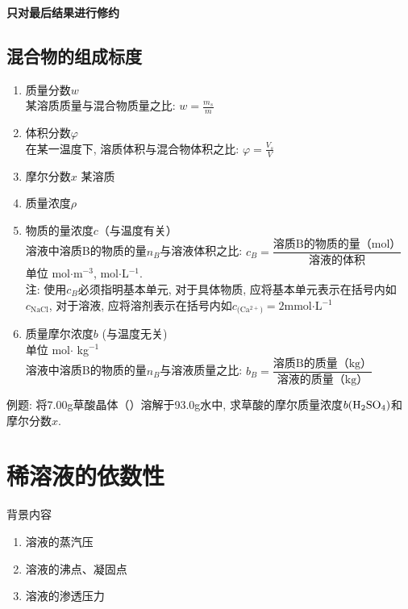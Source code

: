\documentclass[12pt, a4paper, oneside]{ctexbook}
\begin{document}
\textbf{只对最后结果进行修约}



\section*{混合物的组成标度}
\begin{enumerate}
    \item 质量分数$w$ \\某溶质质量与混合物质量之比: $w = \frac{m_s}{m}$
    \item 体积分数$\varphi$\\在某一温度下, 溶质体积与混合物体积之比: $\varphi = \frac{V_s}{V}$
    \item 摩尔分数$x$ 某溶质
    \item 质量浓度$\rho $
    \item 物质的量浓度$c$（与温度有关）\\溶液中溶质B的物质的量$n_B$与溶液体积之比: $c_B = \dfrac{\text{溶质B的物质的量（mol）}}{\text{溶液的体积}}$\\
            单位 mol$\cdot$m$^{-3}$, mol$\cdot$L$^{-1}$.\\
            注: 使用$c_B$必须指明基本单元, 对于具体物质, 应将基本单元表示在括号内如$c_{\text{NaCl}}$, 对于溶液, 应将溶剂表示在括号内如$c_{\text{(Ca$^{2+}$)}} = 2$mmol$\cdot$L$^{-1}$
    \item 质量摩尔浓度$b$ (与温度无关)\\单位 mol$\cdot$ kg$^{-1}$\\
            溶液中溶质B的物质的量$n_B$与溶液质量之比: $b_B = \dfrac{\text{溶质B的质量（kg）}}{\text{溶液的质量（kg）}}$\\
\end{enumerate}
例题: 将7.00g草酸晶体（）溶解于93.0g水中, 求草酸的摩尔质量浓度$b(\ce{H2SO4})$和摩尔分数$x$.\\

\chapter{稀溶液的依数性}
背景内容
\begin{enumerate}
    \item 溶液的蒸汽压
    \item 溶液的沸点、凝固点
    \item 溶液的渗透压力
\end{enumerate}
\newpage
\end{document}
